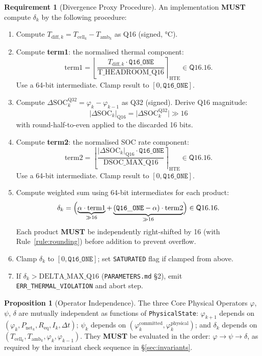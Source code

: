 \documentclass[11pt,letterpaper]{article}
\theoremstyle{definition}
\newtheorem{requirement}{Requirement}[section]
\newtheorem{proposition}{Proposition}[section]
\newcommand{\MUST}{\textbf{MUST}}
\newcommand{\Qfmt}[2]{\ensuremath{\mathsf{Q}#1.#2}}   %
\newcommand{\qval}[1]{\ensuremath{\mathtt{#1}}}        %
\newcommand{\ph}{\varphi}       %
\newcommand{\sy}{\psi}          %
\newcommand{\dv}{\delta}        %
\newcommand{\Req}{R_{\mathrm{eq}}}
\newcommand{\Pnet}{P_{\mathrm{net}}}
\newcommand{\Tcell}{T_{\mathrm{cell}}}
\newcommand{\Tamb}{T_{\mathrm{amb}}}
\newcommand{\Dt}{\Delta t}
\newcommand{\Dsoc}{\Delta\mathrm{SOC}}
\begin{document}
\begin{requirement}[Divergence Proxy Procedure]
\label{req:delta}
An implementation \MUST{} compute $\dv_k$ by the following procedure:
\begin{enumerate}[label=\textbf{Step \arabic*.}]
    \item Compute $T_{\mathrm{diff},k} = \Tcell_k - \Tamb_k$ as Q16 (signed, °C).
    \item Compute \textbf{term1}: the normalised thermal component:
          \[
              \mathrm{term1} = \left\lfloor \frac{T_{\mathrm{diff},k} \cdot \qval{Q16\_ONE}}{\mathrm{T\_HEADROOM\_Q16}} \right\rceil_{\mathrm{HTE}} \in \Qfmt{16}{16}.
          \]
          Use a 64-bit intermediate. Clamp result to $[0, \qval{Q16\_ONE}]$.
    \item Compute $\Dsoc_{k}^{\mathrm{Q32}} = \ph_k - \ph_{k-1}$ as Q32 (signed). Derive Q16 magnitude:
          \[
              |\Dsoc_k|_{\mathrm{Q16}} = \bigl|{\Dsoc_{k}^{\mathrm{Q32}}}\bigr| \gg 16
          \]
          with round-half-to-even applied to the discarded 16 bits.
    \item Compute \textbf{term2}: the normalised SOC rate component:
          \[
              \mathrm{term2} = \left\lfloor \frac{|\Dsoc_k|_{\mathrm{Q16}} \cdot \qval{Q16\_ONE}}{\mathrm{DSOC\_MAX\_Q16}} \right\rceil_{\mathrm{HTE}} \in \Qfmt{16}{16}.
          \]
          Use a 64-bit intermediate. Clamp result to $[0, \qval{Q16\_ONE}]$.
    \item Compute weighted sum using 64-bit intermediates for each product:
          \[
              \dv_k = \Bigl(\underbrace{\alpha \cdot \mathrm{term1}}_{\gg 16} + \underbrace{(\qval{Q16\_ONE} - \alpha) \cdot \mathrm{term2}}_{\gg 16}\Bigr) \in \Qfmt{16}{16}.
          \]
          Each product \MUST{} be independently right-shifted by 16 (with Rule~\ref{rule:rounding}) before addition to prevent overflow.
    \item Clamp $\dv_k$ to $[0, \qval{Q16\_ONE}]$; set \texttt{SATURATED} flag if clamped from above.
    \item If $\dv_k > \mathrm{DELTA\_MAX\_Q16}$ (\texttt{PARAMETERS.md} §2), emit \texttt{ERR\_THERMAL\_VIOLATION} and abort step.
\end{enumerate}
\end{requirement}

\begin{proposition}[Operator Independence]
\label{prop:independence}
The three Core Physical Operators $\ph$, $\sy$, $\dv$ are mutually independent as functions of \texttt{PhysicalState}: $\ph_{k+1}$ depends on $(\ph_k, \Pnet_k, \Req, I_k, \Dt)$; $\sy_k$ depends on $(\ph_k^{\mathrm{committed}}, \ph_k^{\mathrm{physical}})$; and $\dv_k$ depends on $(\Tcell_k, \Tamb_k, \ph_k, \ph_{k-1})$. They \MUST{} be evaluated in the order: $\ph \to \sy \to \dv$, as required by the invariant check sequence in §\ref{sec:invariants}.
\end{proposition}
\end{document}

